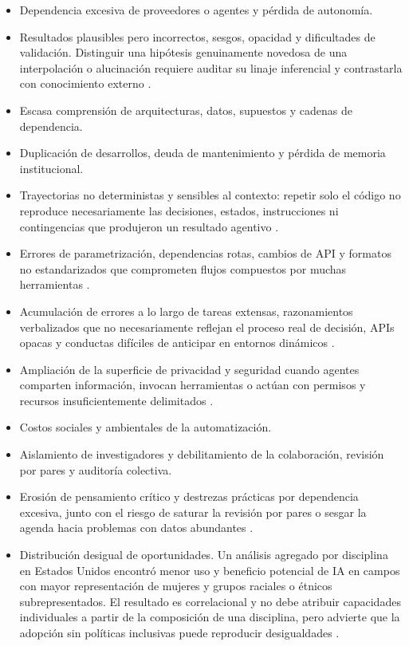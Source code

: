 \documentclass[11pt,a4paper]{article}
\begin{document}
\begin{itemize}
  \item Dependencia excesiva de proveedores o agentes y pérdida de autonomía.
  \item Resultados plausibles pero incorrectos, sesgos, opacidad y dificultades de
  validación. Distinguir una hipótesis genuinamente novedosa de una interpolación
  o alucinación requiere auditar su linaje inferencial y contrastarla con
  conocimiento externo \citep{wei2025agentic}.
  \item Escasa comprensión de arquitecturas, datos, supuestos y cadenas de
  dependencia.
  \item Duplicación de desarrollos, deuda de mantenimiento y pérdida de memoria
  institucional.
  \item Trayectorias no deterministas y sensibles al contexto: repetir solo el
  código no reproduce necesariamente las decisiones, estados, instrucciones ni
  contingencias que produjeron un resultado agentivo
  \citep{wei2025agentic,lu2024aiscientist}.
  \item Errores de parametrización, dependencias rotas, cambios de API y formatos
  no estandarizados que comprometen flujos compuestos por muchas herramientas
  \citep{shen2025shortcutsbench,wei2025agentic}.
  \item Acumulación de errores a lo largo de tareas extensas, razonamientos
  verbalizados que no necesariamente reflejan el proceso real de decisión, APIs
  opacas y conductas difíciles de anticipar en entornos dinámicos
  \citep{schneider2025generative}.
  \item Ampliación de la superficie de privacidad y seguridad cuando agentes
  comparten información, invocan herramientas o actúan con permisos y recursos
  insuficientemente delimitados \citep{schneider2025generative}.
  \item Costos sociales y ambientales de la automatización.
  \item Aislamiento de investigadores y debilitamiento de la colaboración,
  revisión por pares y auditoría colectiva.
  \item Erosión de pensamiento crítico y destrezas prácticas por dependencia
  excesiva, junto con el riesgo de saturar la revisión por pares o sesgar la agenda
  hacia problemas con datos abundantes \citep{wei2025agentic}.
  \item Distribución desigual de oportunidades. Un análisis agregado por
  disciplina en Estados Unidos encontró menor uso y beneficio potencial de IA en
  campos con mayor representación de mujeres y grupos raciales o étnicos
  subrepresentados. El resultado es correlacional y no debe atribuir capacidades
  individuales a partir de la composición de una disciplina, pero advierte que la
  adopción sin políticas inclusivas puede reproducir desigualdades
  \citep{gao2024quantifying}.
\end{itemize}
\end{document}
